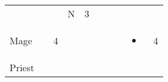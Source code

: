 \documentclass[12pt]{article}
\begin{document}
\begin{longtable}[]{@{}llllllllll@{}}
\begin{minipage}[t]{0.06\columnwidth}
\strut\end{minipage} &
\begin{minipage}[t]{0.06\columnwidth}\raggedright\strut
\strut\end{minipage} &
\begin{minipage}[t]{0.06\columnwidth}\raggedright\strut
\strut\end{minipage} &
\begin{minipage}[t]{0.07\columnwidth}\raggedright\strut
N
\strut\end{minipage} &
\begin{minipage}[t]{0.08\columnwidth}\raggedright\strut
3
\strut\end{minipage}\tabularnewline
\begin{minipage}[t]{0.13\columnwidth}\raggedright\strut
Mage
\strut\end{minipage} &
\begin{minipage}[t]{0.06\columnwidth}\raggedright\strut
\strut\end{minipage} &
\begin{minipage}[t]{0.06\columnwidth}\raggedright\strut
4
\strut\end{minipage} &
\begin{minipage}[t]{0.06\columnwidth}\raggedright\strut
\strut\end{minipage} &
\begin{minipage}[t]{0.06\columnwidth}\raggedright\strut
\strut\end{minipage} &
\begin{minipage}[t]{0.06\columnwidth}\raggedright\strut
\strut\end{minipage} &
\begin{minipage}[t]{0.06\columnwidth}\raggedright\strut
\strut\end{minipage} &
\begin{minipage}[t]{0.06\columnwidth}\raggedright\strut
\strut\end{minipage} &
\begin{minipage}[t]{0.07\columnwidth}\raggedright\strut
\begin{itemize}
\item
\end{itemize}
\strut\end{minipage} &
\begin{minipage}[t]{0.08\columnwidth}\raggedright\strut
4
\strut\end{minipage}\tabularnewline
\begin{minipage}[t]{0.13\columnwidth}\raggedright\strut
Priest
\strut\end{minipage} &

\end{longtable}
\end{document}

